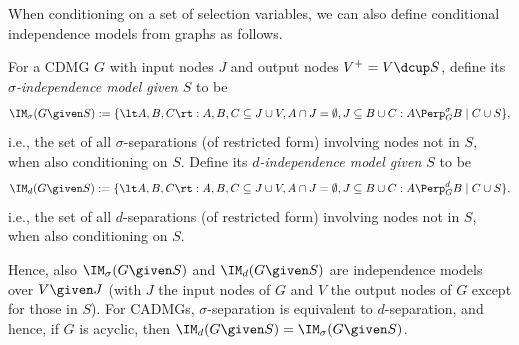 When conditioning on a set of selection variables, we can also define conditional independence models from graphs as follows.
\begin{Def}\label{def:conditional_independence_model_graph}
  For a CDMG $G$ with input nodes $J$ and output nodes $V^+ = V \dcup S$, define its \emph{$\sigma$-independence model given $S$} to be
  $$\IM_\sigma(G \given S) := \{ \lt A, B, C \rt : A, B, C \subseteq J \cup V, A \cap J = \emptyset, J \subseteq B \cup C : A \Perp_G^\sigma B \mid C \cup S \},$$
  i.e., the set of all $\sigma$-separations (of restricted form) involving nodes not in $S$, when also conditioning on $S$. 
  Define its \emph{$d$-independence model given $S$} to be
  $$\IM_d(G \given S) := \{ \lt A, B, C \rt : A, B, C \subseteq J \cup V, A \cap J = \emptyset, J \subseteq B \cup C : A \Perp_G^d B \mid C \cup S \},$$
  i.e., the set of all $d$-separations (of restricted form) involving nodes not in $S$, when also conditioning on $S$.
\end{Def}
Hence, also $\IM_\sigma(G \given S)$ and $\IM_d(G \given S)$ are independence models over $V \given J$ (with $J$ the input nodes of $G$ and $V$ the output nodes of $G$ except for those in $S$).
For CADMGs, $\sigma$-separation is equivalent to $d$-separation, and hence, if $G$ is acyclic, then $\IM_d(G \given S) = \IM_\sigma(G \given S)$.


